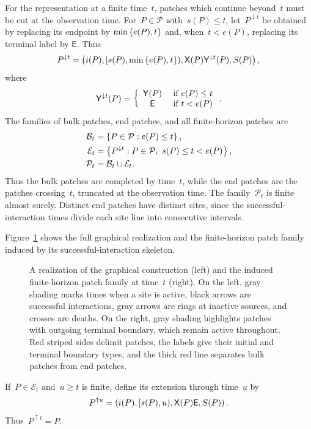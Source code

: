 For the representation at a finite time~$t$, patches which continue beyond~$t$
must be cut at the observation time. For~$P\in\mathcal P$ with~$s(P)\leq t$,
let~$P^{\downarrow t}$ be obtained by replacing its endpoint by
$\min\left\{e(P),t\right\}$ and, when~$t<e(P)$, replacing its terminal label by
$\mathsf E$. Thus
\begin{equation*}
P^{\downarrow t}
=
\left(
 i(P),
 [s(P),\min\left\{e(P),t\right\}),
 \mathsf X(P)\mathsf Y^{\downarrow t}(P),
 S(P)
\right),
\end{equation*}
where
\begin{equation*}
\mathsf Y^{\downarrow t}(P)
=
\left\{\begin{array}{cl} \mathsf Y(P) &\text{ if } e(P)\leq t \\ \mathsf E &\text{ if } t<e(P) \end{array}\right..
\end{equation*}
The families of bulk patches, end patches, and all finite-horizon patches are
\begin{align*}
\mathcal B_t
&=
\left\{P\in\mathcal P:e(P)\leq t\right\},
\\
\mathcal E_t
&=
\left\{P^{\downarrow t}:P\in\mathcal P,\ s(P)\leq t<e(P)\right\},
\\
\mathcal P_t
&=
\mathcal B_t\cup\mathcal E_t.
\end{align*}
Thus the bulk patches are completed by time~$t$, while the end patches are the
patches crossing~$t$, truncated at the observation time. The family~$\mathcal
P_t$ is finite almost surely. Distinct end patches have distinct sites, since
the successful-interaction times divide each site line into consecutive
intervals.

Figure~\ref{fig:patch-geometry} shows the full graphical realization and the
finite-horizon patch family induced by its successful-interaction skeleton.
\begin{figure}[htbp]
\centering
\resizebox{\linewidth}{!}{}
\caption{A realization of the graphical construction (left) and the induced
finite-horizon patch family at time~$t$ (right). On the left, gray shading marks
times when a site is active, black arrows are successful interactions, gray
arrows are rings at inactive sources, and crosses are deaths. On the right,
gray shading highlights patches with outgoing terminal boundary, which remain
active throughout. Red striped sides delimit patches, the labels give their
initial and terminal boundary types, and the thick red line separates bulk
patches from end patches.}
\label{fig:patch-geometry}
\end{figure}
\FloatBarrier

If~$P\in\mathcal E_t$ and~$u\geq t$ is finite, define its extension through
time~$u$ by
\begin{equation}
\label{eq:geometric-patch-extension}
P^{\uparrow u}
=
\left(i(P),[s(P),u),\mathsf X(P)\mathsf E,S(P)\right).
\end{equation}
Thus~$P^{\uparrow t}=P$.
